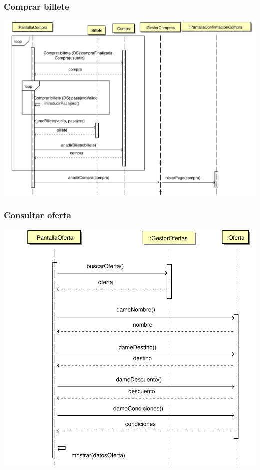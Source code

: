 \documentclass[11pt, a4paper, twoside, titlepage]{article}
\begin{document}
			\subsubsection{Comprar billete}
				\begin{center}
					\includegraphics[scale=.67]{diseno/diagramas/comprarbillete.pdf}
				\end{center}

			\subsubsection{Consultar oferta}
				\begin{center}
					\includegraphics[scale=.7]{diseno/diagramas/consultaroferta.pdf}
				\end{center}
\end{document}
